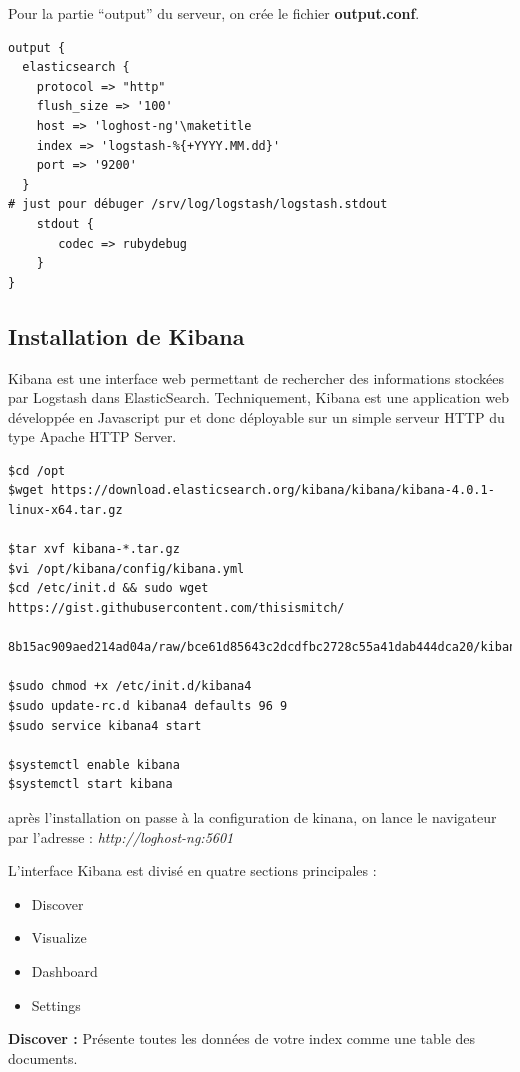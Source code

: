 \documentclass[11pt,a4paper]{article}
\begin{document}
Pour la partie “output” du serveur, on crée le fichier \textbf{output.conf}.
\begin{verbatim}
output {
  elasticsearch {
    protocol => "http"
    flush_size => '100'
    host => 'loghost-ng'\maketitle
    index => 'logstash-%{+YYYY.MM.dd}'
    port => '9200'
  }
# just pour débuger /srv/log/logstash/logstash.stdout
    stdout {
       codec => rubydebug
    }
}
\end{verbatim}

\subsection{Installation de Kibana}
Kibana est une interface web permettant de rechercher des informations stockées par Logstash dans ElasticSearch.
Techniquement, Kibana est une application web développée en Javascript pur et donc déployable sur un simple serveur HTTP du type Apache HTTP Server.
\begin{verbatim}
$cd /opt
$wget https://download.elasticsearch.org/kibana/kibana/kibana-4.0.1-linux-x64.tar.gz

$tar xvf kibana-*.tar.gz
$vi /opt/kibana/config/kibana.yml
$cd /etc/init.d && sudo wget https://gist.githubusercontent.com/thisismitch/
 8b15ac909aed214ad04a/raw/bce61d85643c2dcdfbc2728c55a41dab444dca20/kibana4

$sudo chmod +x /etc/init.d/kibana4
$sudo update-rc.d kibana4 defaults 96 9
$sudo service kibana4 start

$systemctl enable kibana
$systemctl start kibana
\end{verbatim}

après l'installation on passe à la configuration de kinana, on lance le navigateur par l'adresse :  \textit{http://loghost-ng:5601}

L'interface Kibana est divisé en quatre sections principales :

\begin{itemize}
	\item Discover
    \item Visualize
    \item Dashboard
    \item Settings
\end{itemize}

\textbf{Discover : }Présente toutes les données de votre index comme une table des documents.\\
\end{document}
